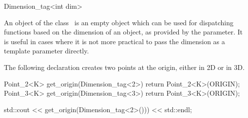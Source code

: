 \begin{ccRefClass} {Dimension_tag<int dim>}

\ccDefinition
An object of the class \ccRefName\ is an empty object which can be used
for dispatching functions based on the dimension of an object, as provided
by the  parameter.  It is useful in cases where it is not more
practical to pass the dimension as a template parameter directly.


\ccConstants


\ccCreation
{}

\ccExample

The following declaration creates two points at the origin, either in 2D or in 3D.

\begin{cprog}
  Point_2<K> get_origin(Dimension_tag<2>) { return Point_2<K>(ORIGIN); }
  Point_3<K> get_origin(Dimension_tag<3>) { return Point_3<K>(ORIGIN); }

  std::cout << get_origin(Dimension_tag<2>())) << std::endl;
\end{cprog} 


\end{ccRefClass} 
